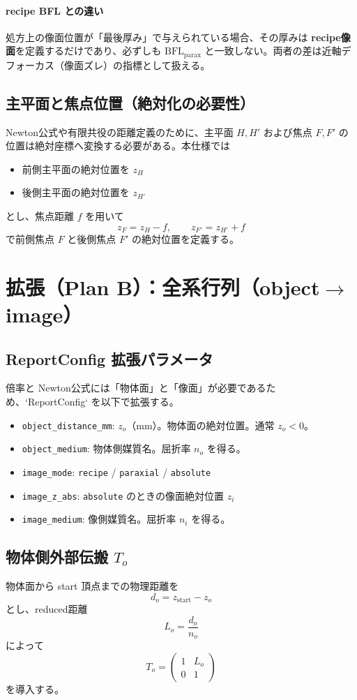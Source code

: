 \paragraph{recipe BFL との違い}
処方上の像面位置が「最後厚み」で与えられている場合、その厚みは \textbf{recipe像面}を定義するだけであり、必ずしも $\mathrm{BFL}_{\mathrm{parax}}$ と一致しない。両者の差は近軸デフォーカス（像面ズレ）の指標として扱える。

\subsection{主平面と焦点位置（絶対化の必要性）}
Newton公式や有限共役の距離定義のために、主平面 $H,H'$ および焦点 $F,F'$ の位置は絶対座標へ変換する必要がある。本仕様では
\begin{itemize}
  \item 前側主平面の絶対位置を $z_H$
  \item 後側主平面の絶対位置を $z_{H'}$
\end{itemize}
とし、焦点距離 $f$ を用いて
\[
z_F = z_H - f,
\qquad
z_{F'} = z_{H'} + f
\]
で前側焦点 $F$ と後側焦点 $F'$ の絶対位置を定義する。

\section{拡張（Plan B）：全系行列（object$\to$image）}

\subsection{ReportConfig 拡張パラメータ}
倍率と Newton公式には「物体面」と「像面」が必要であるため、`ReportConfig` を以下で拡張する。
\begin{itemize}
  \item \texttt{object\_distance\_mm}: $z_o$（mm）。物体面の絶対位置。通常 $z_o<0$。
  \item \texttt{object\_medium}: 物体側媒質名。屈折率 $n_o$ を得る。
  \item \texttt{image\_mode}: \texttt{recipe} / \texttt{paraxial} / \texttt{absolute}
  \item \texttt{image\_z\_abs}: \texttt{absolute} のときの像面絶対位置 $z_i$
  \item \texttt{image\_medium}: 像側媒質名。屈折率 $n_i$ を得る。
\end{itemize}

\subsection{物体側外部伝搬 $T_o$}
物体面から start 頂点までの物理距離を
\[
d_o = z_{\mathrm{start}} - z_o
\]
とし、reduced距離
\[
L_o = \frac{d_o}{n_o}
\]
によって
\[
T_o = \begin{pmatrix}1&L_o\\0&1\end{pmatrix}
\]
を導入する。

